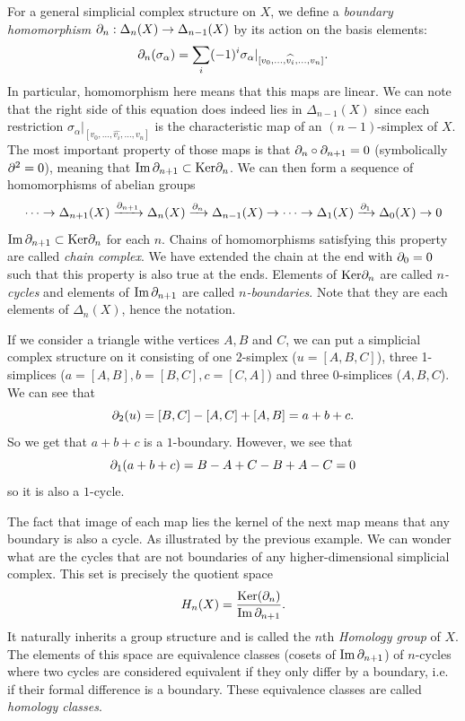     For a general simplicial complex structure on $X$, we define a \emph{boundary homomorphism} $\partial_n:\Delta_n(X)\to\Delta_{n-1}(X)$ by its action on the basis elements:
    \begin{equation}
        \partial_n(\sigma_\alpha)=\sum_i(-1)^i\sigma_\alpha|_{[v_0,\dots,\widehat{v_i},\dots,v_n]}.
    \end{equation}
    In particular, homomorphism here means that this maps are linear. We can note that the right side of this equation does indeed lies in $\Delta_{n-1}(X)$ since each restriction $\sigma_\alpha|_{[v_0,\dots,\hat{v_i},\dots,v_n]}$ is the characteristic map of an $(n-1)$-simplex of $X$. The most important property of those maps is that $\partial_{n}\circ\partial_{n+1}=0$ (symbolically $\partial^2=0$), meaning that $\Im\partial_{n+1}\subset\text{Ker}\partial_n$. We can then form a sequence of homomorphisms of abelian groups
    \begin{equation}
        \dots\to \Delta_{n+1}(X)\xrightarrow[]{\partial_{n+1}}\Delta_n(X)\xrightarrow[]{\partial_{n}}\Delta_{n-1}(X)\to\dots\to\Delta_1(X)\xrightarrow[]{\partial_{1}}\Delta_0(X)\to 0
    \end{equation}
    $\Im\partial_{n+1}\subset\text{Ker}\partial_n$ for each $n$. Chains of homomorphisms satisfying this property are called \emph{chain complex}. We have extended the chain at the end with $\partial_0=0$ such that this property is also true at the ends. Elements of $\text{Ker}\partial_n$ are called \emph{$n$-cycles} and elements of $\Im\partial_{n+1}$ are called \emph{$n$-boundaries}. Note that they are each elements of $\Delta_n(X)$, hence the notation. 
    \begin{examp*}
        If we consider a triangle withe vertices $A,B$ and $C$, we can put a simplicial complex structure on it consisting of one $2$-simplex ($u=[A,B,C]$), three 1-simplices ($a=[A,B],b=[B,C],c=[C,A]$) and three $0$-simplices ($A,B,C$). We can see that
        \begin{equation}
            \partial_2(u)=[B,C]-[A,C]+[A,B] = a+b+c.
        \end{equation} 
        So we get that $a+b+c$ is a $1$-boundary. However, we see that
        \begin{equation}
            \partial_1(a+b+c)=B-A+C-B+A-C=0
        \end{equation}
        so it is also a $1$-cycle.
    \end{examp*}
    The fact that image of each map lies the kernel of the next map means that any boundary is also a cycle. As illustrated by the previous example. We can wonder what are the cycles that are not boundaries of any higher-dimensional simplicial complex. This set is precisely the quotient space
    \begin{equation}
        H_n(X)=\frac{\text{Ker}(\partial_n)}{\Im\partial_{n+1}}.
    \end{equation}
    It naturally inherits a group structure and is called the $n$th \emph{Homology group} of $X$. The elements of this space are equivalence classes (cosets of $\Im\partial_{n+1}$) of $n$-cycles where two cycles are considered equivalent if they only differ by a boundary, i.e. if their formal difference is a boundary. These equivalence classes are called \emph{homology classes}.

